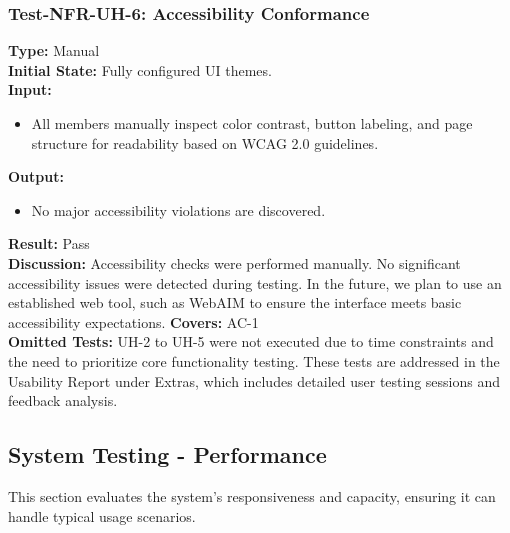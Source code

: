 \documentclass[12pt, titlepage]{article}
\begin{document}
\subsubsection{Test-NFR-UH-6: Accessibility Conformance}
\textbf{Type:} Manual \\
\textbf{Initial State:} Fully configured UI themes. \\
\textbf{Input:}
\begin{itemize}
    \item All members manually inspect color contrast, button labeling, and page structure for readability based on WCAG 2.0 guidelines.
\end{itemize}
\textbf{Output:}
\begin{itemize}
    \item No major accessibility violations are discovered.
\end{itemize}
\textbf{Result:} Pass \\
\textbf{Discussion:} Accessibility checks were performed manually. No significant accessibility issues were detected during testing. In the future, we plan to use an established web tool, such as WebAIM to ensure the interface meets basic accessibility expectations.
\textbf{Covers:} AC-1 \\

\textbf{Omitted Tests:} UH-2 to UH-5 were not executed due to time constraints and the need to prioritize core functionality testing. These tests are addressed in the Usability Report under Extras, which includes detailed user testing sessions and feedback analysis.

\subsection{System Testing - Performance}
This section evaluates the system's responsiveness and capacity, ensuring it can handle typical usage scenarios.
\end{document}
